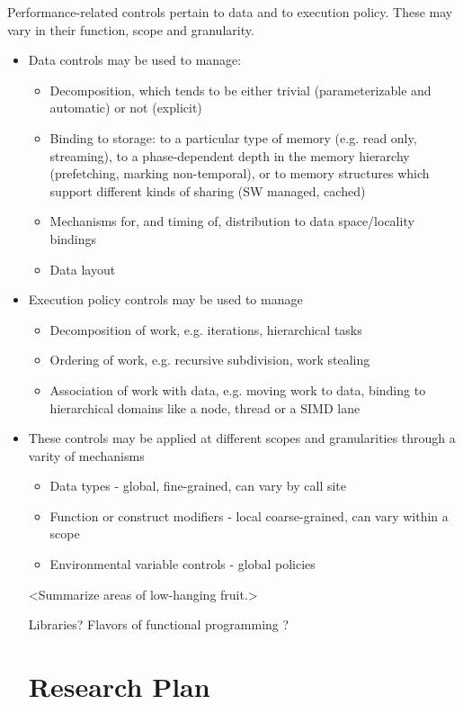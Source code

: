 Performance-related controls pertain to data and to execution policy.  These may vary in their function, scope and granularity.
    \begin{itemize}
    \item Data controls may be used to manage:
      \begin{itemize} 
      \item Decomposition, which tends to be either trivial (parameterizable and automatic) or not (explicit)
      \item Binding to storage: to a particular type of memory (e.g. read only, streaming), to a phase-dependent depth in the memory hierarchy (prefetching, marking non-temporal), or to memory structures which support different kinds of sharing (SW managed, cached)
      \item Mechanisms for, and timing of, distribution to data space/locality bindings
      \item Data layout
      \end{itemize}
    \item Execution policy controls may be used to manage
      \begin{itemize} 
      \item Decomposition of work, e.g. iterations, hierarchical tasks
      \item Ordering of work, e.g. recursive subdivision, work stealing
      \item Association of work with data, e.g. moving work to data, binding to hierarchical domains like a node, thread or a SIMD lane
      \end{itemize}
    \item These controls may be applied at different scopes and granularities through a varity of mechanisms
      \begin{itemize} 
      \item Data types - global, fine-grained, can vary by call site
      \item Function or construct modifiers - local coarse-grained, can vary within a scope
      \item Environmental variable controls - global policies
      \end{itemize}

<Summarize areas of low-hanging fruit.>

Libraries? 
Flavors of functional programming ?

\section{Research Plan}


\end{itemize}
